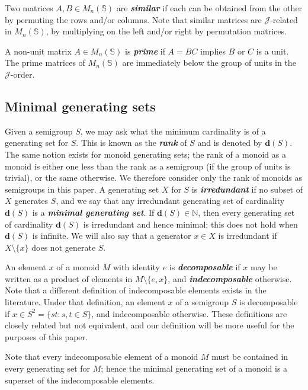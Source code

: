 \documentclass[11pt]{article}
\newcommand{\defn}[1]{\textbf{\textit{#1}}}
\numberwithin{equation}{section}
\newcommand{\set}[2]{\ensuremath{\{#1 : #2 \}}}
\newcommand{\J}{\mathscr{J}}
\newcommand{\N}{\mathbb{N}}
\begin{document}
Two matrices $A, B\in M_n(\mathbb{S})$ are \defn{similar} if each can be
obtained from the other by permuting the rows and/or columns. Note that similar
matrices are $\J$-related in $M_n(\mathbb{S})$, by multiplying on the left
and/or right by permutation matrices.

A non-unit matrix $A \in M_n(\mathbb{S})$ is \defn{prime} if $A = BC$ implies
$B$ or $C$ is a unit. The prime matrices of $M_n(\mathbb{S})$ are immediately
below the group of units in the $\J$-order. 

\subsection{Minimal generating sets}
\label{sec:MinimalGenSets}

Given a semigroup $S$, we may ask what the minimum cardinality is of a
generating set for $S$. This is known as the \defn{rank} of $S$ and is denoted
by $\mathbf{d}(S)$. The same notion exists for monoid generating sets; the rank
of a monoid as a monoid is either one less than the rank as a semigroup (if
the group of units is trivial), or the same otherwise. We therefore consider
only the rank of monoids as semigroups in this paper. A generating
set $X$ for $S$ is \defn{irredundant} if no subset of $X$ generates $S$, and we
say that any irredundant generating set of cardinality $\mathbf{d}(S)$ is a
\defn{minimal generating set}. If $\mathbf{d}(S) \in \N$, then every generating
set of cardinality $\mathbf{d}(S)$ is irredundant and hence minimal; this does
not hold when $\mathbf{d}(S)$ is infinite. We will also say that a generator $x
\in X$ is irredundant if $X \setminus \{x\}$ does not generate $S$.


An element $x$ of a monoid $M$ with identity $e$ is \defn{decomposable} if $x$
may be written as a product of elements in $M\setminus\{e, x\}$, and
\defn{indecomposable} otherwise. Note that a different definition of
indecomposable elements exists in the literature. Under that definition, an
element $x$ of a semigroup $S$ is decomposable if $x \in S^2 = \set{st}{s, t \in
  S}$, and indecomposable otherwise. These definitions are closely related but
not equivalent, and our definition will be more useful for the purposes of this
paper.

Note that every indecomposable element of a monoid $M$ must be contained in
every generating set for $M$; hence the minimal generating set of a monoid is a
superset of the indecomposable elements.
\end{document}
